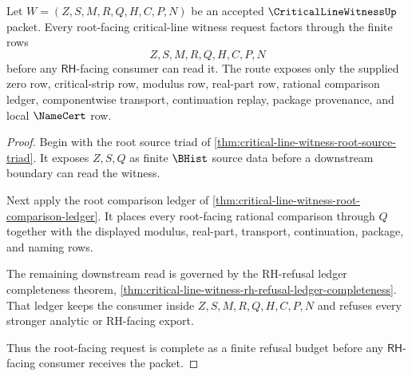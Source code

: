 \begin{theorem}
\label{thm:critical-line-witness-root-refusal-budget-completion}
Let $W=(Z,S,M,R,Q,H,C,P,N)$ be an accepted $\CriticalLineWitnessUp$ packet. Every root-facing critical-line witness request factors through the finite rows
$$
Z,S,M,R,Q,H,C,P,N
$$
before any $\mathsf{RH}$-facing consumer can read it. The route exposes only the supplied zero row, critical-strip row, modulus row, real-part row, rational comparison ledger, componentwise transport, continuation replay, package provenance, and local $\NameCert$ row.
\end{theorem}
\begin{proof}
Begin with the root source triad of \autoref{thm:critical-line-witness-root-source-triad}. It exposes $Z,S,Q$ as finite $\BHist$ source data before a downstream boundary can read the witness.

Next apply the root comparison ledger of \autoref{thm:critical-line-witness-root-comparison-ledger}. It places every root-facing rational comparison through $Q$ together with the displayed modulus, real-part, transport, continuation, package, and naming rows.

The remaining downstream read is governed by the RH-refusal ledger completeness theorem, \autoref{thm:critical-line-witness-rh-refusal-ledger-completeness}. That ledger keeps the consumer inside $Z,S,M,R,Q,H,C,P,N$ and refuses every stronger analytic or RH-facing export.

Thus the root-facing request is complete as a finite refusal budget before any $\mathsf{RH}$-facing consumer receives the packet.
\end{proof}


